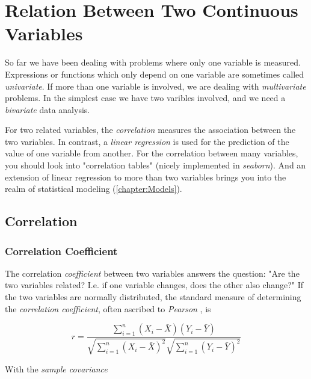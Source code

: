 \chapter{Relation Between Two Continuous Variables}

So far we have been dealing with problems where only one variable is measured. Expressions or functions which only depend on one variable are sometimes called \emph{univariate}. If more than one variable is involved, we are dealing with \emph{multivariate} problems. In the simplest case we have two varibles involved, and we need a \emph{bivariate} data analysis.

For two related variables, the \emph{correlation} measures the association between the two variables. In contrast, a \emph{linear regression} is used for the prediction of the value of one variable from another. For the correlation between many variables, you should look into "correlation tables" (nicely implemented in \emph{seaborn}).  And an extension of linear regression to more than two variables brings you into the realm of statistical modeling (\ref{chapter:Models}).

\section{Correlation}

\subsection{Correlation Coefficient} 

The \gls{correlation} \emph{coefficient} between two variables answers the question: "Are the two variables related? I.e. if one variable changes, does the other also change?" If the two variables are normally distributed, the standard measure of determining the \emph{correlation coefficient}, often ascribed to \emph{Pearson} , is

\begin{equation}\label{eq:pearson}
  r = \frac{\sum\limits_{i=1}^n (X_i - \bar{X})(Y_i - \bar{Y})}{\sqrt{\sum\limits_{i=1}^n (X_i - \bar{X})^2} \sqrt{\sum\limits_{i=1}^n (Y_i - \bar{Y})^2}}
\end{equation}

With the \emph{sample covariance}

